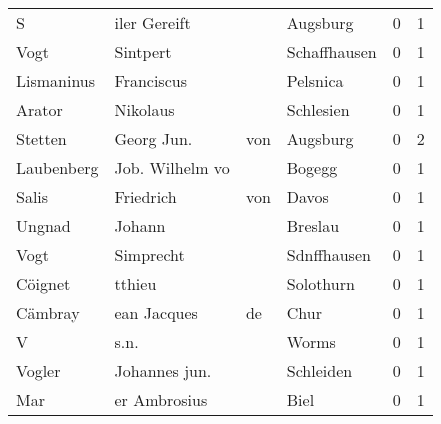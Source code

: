 \begin{tabular}{llllrr}
                        S &                       iler Gereift &             &                                    Augsburg &          0 &         1 \\
                     Vogt &                           Sintpert &             &                                Schaffhausen &          0 &         1 \\
               Lismaninus &                         Franciscus &             &                                    Pelsnica &          0 &         1 \\
                   Arator &                           Nikolaus &             &                                   Schlesien &          0 &         1 \\
                  Stetten &                        Georg  Jun. &         von &                                    Augsburg &          0 &         2 \\
               Laubenberg &                    Job. Wilhelm vo &             &                                      Bogegg &          0 &         1 \\
                    Salis &                          Friedrich &         von &                                       Davos &          0 &         1 \\
                   Ungnad &                             Johann &             &                                     Breslau &          0 &         1 \\
                     Vogt &                          Simprecht &             &                                 Sdnffhausen &          0 &         1 \\
                  Cöignet &                             tthieu &             &                                   Solothurn &          0 &         1 \\
                  Cämbray &                        ean Jacques &          de &                                        Chur &          0 &         1 \\
                        V &                               s.n. &             &                                       Worms &          0 &         1 \\
                   Vogler &                      Johannes jun. &             &                                   Schleiden &          0 &         1 \\
                      Mar &                       er Ambrosius &             &                                        Biel &          0 &         1 \\

\end{tabular}
